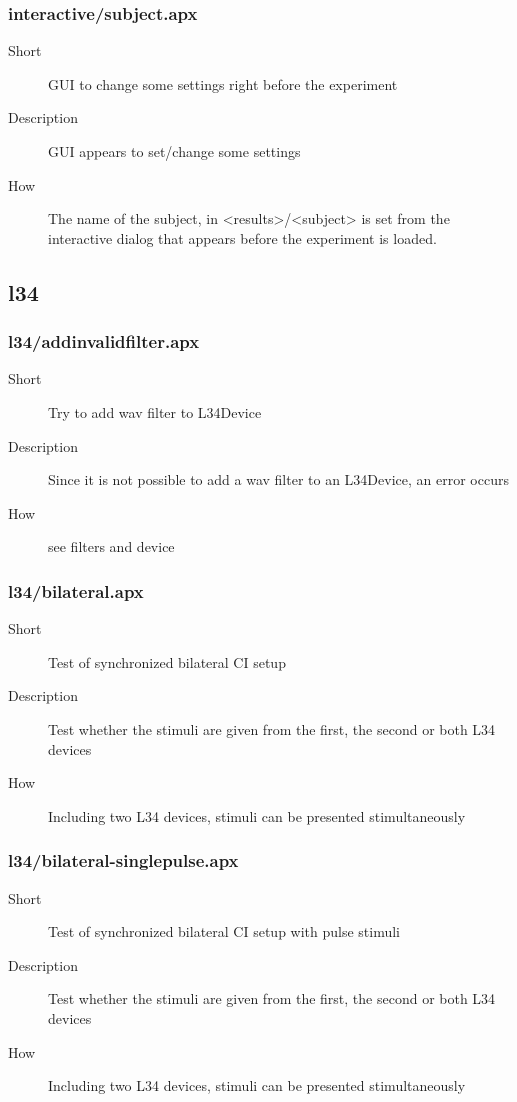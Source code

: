 \subsubsection{interactive/subject.apx}
\begin{description}
\item[Short] 
 GUI to change some settings right before the experiment
\item[Description] 
 GUI appears to set/change some settings
\item[How] 
 The name of the subject, in \textless{}results\textgreater{}/\textless{}subject\textgreater{} is set from the interactive dialog that appears before the experiment is loaded.
\end{description}

\subsection{l34}
\subsubsection{l34/addinvalidfilter.apx}
\begin{description}
\item[Short] 
 Try to add wav filter to L34Device
\item[Description] 
 Since it is not possible to add a wav filter to an L34Device, an error occurs
\item[How] 
 see filters and device
\end{description}

\subsubsection{l34/bilateral.apx}
\begin{description}
\item[Short] 
 Test of synchronized bilateral CI setup
\item[Description] 
 Test whether the stimuli are given from the first, the second or both L34 devices
\item[How] 
 Including two L34 devices, stimuli can be presented stimultaneously
\end{description}

\subsubsection{l34/bilateral-singlepulse.apx}
\begin{description}
\item[Short] 
 Test of synchronized bilateral CI setup with pulse stimuli
\item[Description] 
 Test whether the stimuli are given from the first, the second or both L34 devices
\item[How] 
 Including two L34 devices, stimuli can be presented stimultaneously
\end{description}

